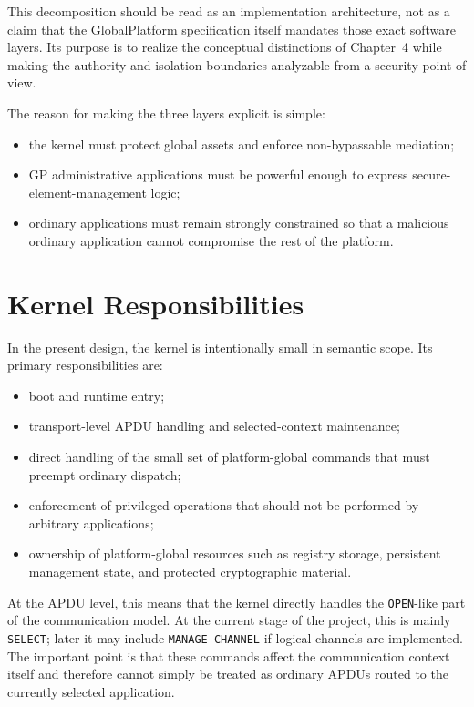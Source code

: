 This decomposition should be read as an implementation architecture, not
as a claim that the GlobalPlatform specification itself mandates those
exact software layers. Its purpose is to realize the conceptual
distinctions of Chapter~4 while making the authority and isolation
boundaries analyzable from a security point of view.

The reason for making the three layers explicit is simple:
\begin{itemize}
\item the kernel must protect global assets and enforce non-bypassable
  mediation;
\item GP administrative applications must be powerful enough to express
  secure-element-management logic;
\item ordinary applications must remain strongly constrained so that a
  malicious ordinary application cannot compromise the rest of the
  platform.
\end{itemize}

\section{Kernel Responsibilities}
\label{sec:system-kernel-responsibilities}


In the present design, the kernel is intentionally small in semantic
scope. Its primary responsibilities are:

\begin{itemize}
\item boot and runtime entry;
\item transport-level APDU handling and selected-context maintenance;
\item direct handling of the small set of platform-global commands that
  must preempt ordinary dispatch;
\item enforcement of privileged operations that should not be performed
  by arbitrary applications;
\item ownership of platform-global resources such as registry storage,
  persistent management state, and protected cryptographic material.
\end{itemize}

At the APDU level, this means that the kernel directly handles the
\texttt{OPEN}-like part of the communication model. At the current stage
of the project, this is mainly \texttt{SELECT}; later it may include
\texttt{MANAGE CHANNEL} if logical channels are implemented. The
important point is that these commands affect the communication context
itself and therefore cannot simply be treated as ordinary APDUs routed to
the currently selected application.

